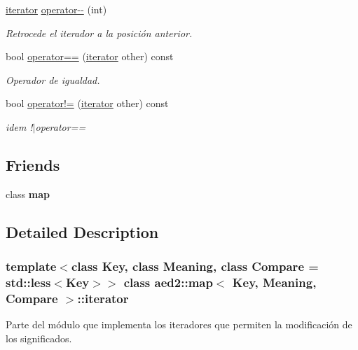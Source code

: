 \begin{DoxyCompactItemize}
\hyperlink{classaed2_1_1map_1_1iterator}{iterator} \hyperlink{classaed2_1_1map_1_1iterator_add45e9ddbb8eeda99326cdb9ac9dd225}{operator-\/-\/} (int)
\begin{DoxyCompactList}\small\item\em Retrocede el iterador a la posición anterior. \end{DoxyCompactList}\item 
bool \hyperlink{classaed2_1_1map_1_1iterator_a34f6622845af93ca42f1be8516eeafa2}{operator==} (\hyperlink{classaed2_1_1map_1_1iterator}{iterator} other) const
\begin{DoxyCompactList}\small\item\em Operador de igualdad. \end{DoxyCompactList}\item 
\mbox{\label{classaed2_1_1map_1_1iterator_a748cdf8c35707d1c2e9ef8ef9d862d37}} 
bool \hyperlink{classaed2_1_1map_1_1iterator_a748cdf8c35707d1c2e9ef8ef9d862d37}{operator!=} (\hyperlink{classaed2_1_1map_1_1iterator}{iterator} other) const
\begin{DoxyCompactList}\small\item\em idem !$\vert$operator== \end{DoxyCompactList}\end{DoxyCompactItemize}
\subsection*{Friends}
\begin{DoxyCompactItemize}
\item 
\mbox{\label{classaed2_1_1map_1_1iterator_aeda338414e516b47761f994fb78056c6}} 
class {\bfseries map}
\end{DoxyCompactItemize}


\subsection{Detailed Description}
\subsubsection*{template$<$class Key, class Meaning, class Compare = std\+::less$<$\+Key$>$$>$\newline
class aed2\+::map$<$ Key, Meaning, Compare $>$\+::iterator}

Parte del módulo que implementa los iteradores que permiten la modificación de los significados. 

